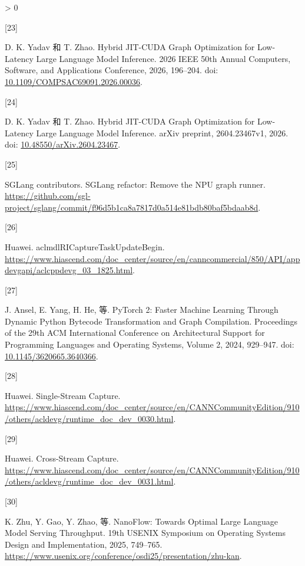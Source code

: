 \documentclass[
  UTF8,
  zihao=5]{ctexart}
\newlength{\cslhangindent}
\newlength{\csllabelwidth}
\newenvironment{CSLReferences}[2] %
 {%
  \setlength{\parindent}{0pt}
  \ifodd #1 \everypar{\setlength{\hangindent}{\cslhangindent}}\ignorespaces\fi
  \ifnum #2 > 0
  \setlength{\parskip}{#2\baselineskip}
  \fi
 }%
 {}
\newcommand{\CSLLeftMargin}[1]{\parbox[t]{\csllabelwidth}{#1}}
\newcommand{\CSLRightInline}[1]{\parbox[t]{\linewidth - \csllabelwidth}{#1}\par}
\begin{document}
\begin{CSLReferences}{0}{0}
\leavevmode{}%
\CSLLeftMargin{{[}23{]} }%
\CSLRightInline{D. K. Yadav 和 T. Zhao. {Hybrid JIT-CUDA Graph
Optimization for Low-Latency Large Language Model Inference}. 2026 IEEE
50th Annual Computers, Software, and Applications Conference, 2026,
196--204. doi:
\href{https://doi.org/10.1109/COMPSAC69091.2026.00036}{10.1109/COMPSAC69091.2026.00036}.}

\leavevmode{}%
\CSLLeftMargin{{[}24{]} }%
\CSLRightInline{D. K. Yadav 和 T. Zhao. {Hybrid JIT-CUDA Graph
Optimization for Low-Latency Large Language Model Inference}. arXiv
preprint, 2604.23467v1, 2026. doi:
\href{https://doi.org/10.48550/arXiv.2604.23467}{10.48550/arXiv.2604.23467}.}

\leavevmode{}%
\CSLLeftMargin{{[}25{]} }%
\CSLRightInline{SGLang contributors. {SGLang refactor: Remove the NPU
graph runner}.
\url{https://github.com/sgl-project/sglang/commit/f96d5b1ca8a7817d0a514e81bdb80baf5bdaab8d}.}

\leavevmode{}%
\CSLLeftMargin{{[}26{]} }%
\CSLRightInline{Huawei. {aclmdlRICaptureTaskUpdateBegin}.
\url{https://www.hiascend.com/doc_center/source/en/canncommercial/850/API/appdevgapi/aclcppdevg_03_1825.html}.}

\leavevmode{}%
\CSLLeftMargin{{[}27{]} }%
\CSLRightInline{J. Ansel, E. Yang, H. He, 等. PyTorch 2: Faster Machine
Learning Through Dynamic Python Bytecode Transformation and Graph
Compilation. Proceedings of the 29th ACM International Conference on
Architectural Support for Programming Languages and Operating Systems,
Volume 2, 2024, 929--947. doi:
\href{https://doi.org/10.1145/3620665.3640366}{10.1145/3620665.3640366}.}

\leavevmode{}%
\CSLLeftMargin{{[}28{]} }%
\CSLRightInline{Huawei. {Single-Stream Capture}.
\url{https://www.hiascend.com/doc_center/source/en/CANNCommunityEdition/910/others/acldevg/runtime_doc_dev_0030.html}.}

\leavevmode{}%
\CSLLeftMargin{{[}29{]} }%
\CSLRightInline{Huawei. {Cross-Stream Capture}.
\url{https://www.hiascend.com/doc_center/source/en/CANNCommunityEdition/910/others/acldevg/runtime_doc_dev_0031.html}.}

\leavevmode{}%
\CSLLeftMargin{{[}30{]} }%
\CSLRightInline{K. Zhu, Y. Gao, Y. Zhao, 等. {NanoFlow: Towards Optimal
Large Language Model Serving Throughput}. 19th USENIX Symposium on
Operating Systems Design and Implementation, 2025, 749--765.
\url{https://www.usenix.org/conference/osdi25/presentation/zhu-kan}.}


\end{CSLReferences}
\end{document}
